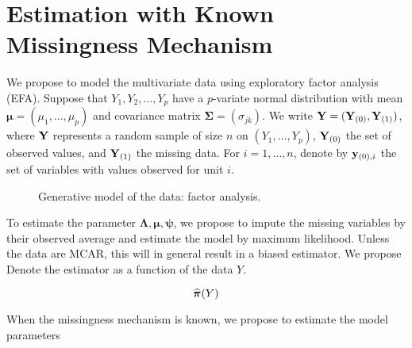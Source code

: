 \documentclass{article}
\begin{document}
\section{Estimation with Known Missingness Mechanism}
We propose to model the multivariate data using exploratory factor analysis (EFA). Suppose that $Y_1, Y_2, \dots, Y_p$ have a $p$-variate normal distribution with mean $\bm\mu = (\mu_1, \dots, \mu_p)$ and covariance matrix $\bm\Sigma =(\sigma_{jk})$. We write ${\bf Y} = ({\bf Y}_{(0)}, {\bf Y}_{(1)})$, where ${\bf Y}$ represents a random sample of size $n$ on $(Y_1, \dots, Y_p)$, ${\bf Y}_{(0)}$ the set of observed values, and ${\bf Y}_{(1)}$ the missing data. For $i=1, \dots, n$, denote by ${\bf y}_{(0), i}$ the set of variables with values observed for unit $i$.

\begin{figure}
\centering
\caption{Generative model of the data: factor analysis.}
\end{figure}

To estimate the parameter $\bm\Lambda, \bm\mu,\bm\psi$, we propose to impute the missing variables by their observed average and estimate the model by maximum likelihood. Unless the data are MCAR, this will in general result in a biased estimator. We propose  Denote the estimator as a function of the data $Y$. 

\begin{equation}
    \widehat{{\bm{\pi}}}(Y)
\end{equation}

When the missingness mechanism is known, we propose to estimate the model parameters 
\end{document}
